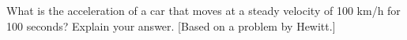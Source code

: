  What is the acceleration of a car that moves at a steady
velocity of 100 km/h for 100 seconds? Explain your answer.
[Based on a problem by Hewitt.]
